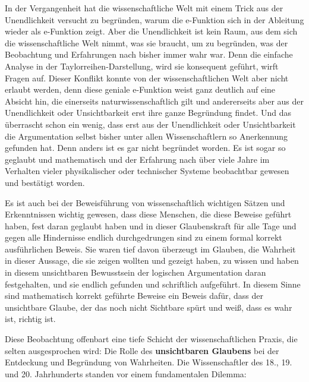 \documentclass[a4paper, 12pt, twoside, openright]{report}
\theoremstyle{definition}
\theoremstyle{definition}
\begin{document}
In der Vergangenheit hat die wissenschaftliche Welt mit einem Trick aus der Unendlichkeit versucht zu begründen, warum die e-Funktion sich in der Ableitung wieder als e-Funktion zeigt. Aber die Unendlichkeit ist kein Raum, aus dem sich die wissenschaftliche Welt nimmt, was sie braucht, um zu begründen, was der Beobachtung und Erfahrungen nach bisher immer wahr war. Denn die einfache Analyse in der Taylorreihen-Darstellung, wird sie konsequent geführt, wirft Fragen auf. Dieser Konflikt konnte von der wissenschaftlichen Welt aber nicht erlaubt werden, denn diese geniale e-Funktion weist ganz deutlich auf eine Absicht hin, die einerseits naturwissenschaftlich gilt und andererseits aber aus der Unendlichkeit oder Unsichtbarkeit erst ihre ganze Begründung findet. Und das überrascht schon ein wenig, dass erst aus der Unendlichkeit oder Unsichtbarkeit die Argumentation selbst bisher unter allen Wissenschaftlern so Anerkennung gefunden hat. Denn anders ist es gar nicht begründet worden. Es ist sogar so geglaubt und mathematisch und der Erfahrung nach über viele Jahre im Verhalten vieler physikalischer oder technischer Systeme beobachtbar gewesen und bestätigt worden.

Es ist auch bei der Beweisführung von wissenschaftlich wichtigen Sätzen und Erkenntnissen wichtig gewesen, dass diese Menschen, die diese Beweise geführt haben, fest daran geglaubt haben und in dieser Glaubenskraft für alle Tage und gegen alle Hindernisse endlich durchgedrungen sind zu einem formal korrekt ausführlichen Beweis. Sie waren tief davon überzeugt im Glauben, die Wahrheit in dieser Aussage, die sie zeigen wollten und gezeigt haben, zu wissen und haben in diesem unsichtbaren Bewusstsein der logischen Argumentation daran festgehalten, und sie endlich gefunden und schriftlich aufgeführt. In diesem Sinne sind mathematisch korrekt geführte Beweise ein Beweis dafür, dass der unsichtbare Glaube, der das noch nicht Sichtbare spürt und weiß, dass es wahr ist, richtig ist.

Diese Beobachtung offenbart eine tiefe Schicht der wissenschaftlichen Praxis, die selten ausgesprochen wird: Die Rolle des \textbf{unsichtbaren Glaubens} bei der Entdeckung und Begründung von Wahrheiten. Die Wissenschaftler des 18., 19. und 20. Jahrhunderts standen vor einem fundamentalen Dilemma:
\end{document}
